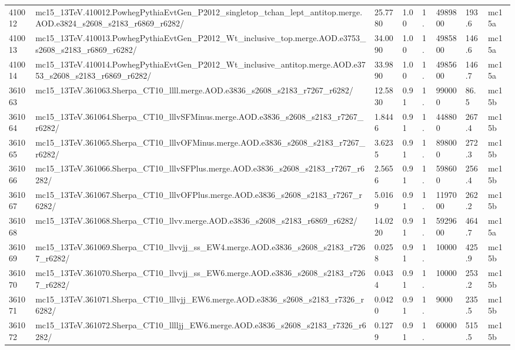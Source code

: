 \begin{sidewaystable}[!hp]
\begin{center}
{\begin{tabular}{llllllll}
410012  &  mc15\_13TeV.410012.PowhegPythiaEvtGen\_P2012\_singletop\_tchan\_lept\_antitop.merge.AOD.e3824\_s2608\_s2183\_r6869\_r6282/  &  25.7780  &  1.00  &  1.  &  4989800  &  193.6  &  mc15a \\
410013  &  mc15\_13TeV.410013.PowhegPythiaEvtGen\_P2012\_Wt\_inclusive\_top.merge.AOD.e3753\_s2608\_s2183\_r6869\_r6282/  &  34.0090  &  1.00  &  1.  &  4985800  &  146.6  &  mc15a \\
410014  &  mc15\_13TeV.410014.PowhegPythiaEvtGen\_P2012\_Wt\_inclusive\_antitop.merge.AOD.e3753\_s2608\_s2183\_r6869\_r6282/  &  33.9890  &  1.00  &  1.  &  4985600  &  146.7  &  mc15a \\
\hline
361063  &  mc15\_13TeV.361063.Sherpa\_CT10\_llll.merge.AOD.e3836\_s2608\_s2183\_r7267\_r6282/  &  12.5830  &  0.91  &  1.  &  990000  &  86.5  &  mc15b \\
361064  &  mc15\_13TeV.361064.Sherpa\_CT10\_lllvSFMinus.merge.AOD.e3836\_s2608\_s2183\_r7267\_r6282/  &  1.8446  &  0.91  &  1.  &  448800  &  267.4  &  mc15b \\
361065  &  mc15\_13TeV.361065.Sherpa\_CT10\_lllvOFMinus.merge.AOD.e3836\_s2608\_s2183\_r7267\_r6282/  &  3.6235  &  0.91  &  1.  &  898000  &  272.3  &  mc15b \\
361066  &  mc15\_13TeV.361066.Sherpa\_CT10\_lllvSFPlus.merge.AOD.e3836\_s2608\_s2183\_r7267\_r6282/  &  2.5656  &  0.91  &  1.  &  598600  &  256.4  &  mc15b \\
361067  &  mc15\_13TeV.361067.Sherpa\_CT10\_lllvOFPlus.merge.AOD.e3836\_s2608\_s2183\_r7267\_r6282/  &  5.0169  &  0.91  &  1.  &  1197000  &  262.2  &  mc15b \\
361068  &  mc15\_13TeV.361068.Sherpa\_CT10\_llvv.merge.AOD.e3836\_s2608\_s2183\_r6869\_r6282/  &  14.0220  &  0.91  &  1.  &  5929600  &  464.7  &  mc15a \\
361069  &  mc15\_13TeV.361069.Sherpa\_CT10\_llvvjj\_ss\_EW4.merge.AOD.e3836\_s2608\_s2183\_r7267\_r6282/  &  0.0258  &  0.91  &  1.  &  10000  &  425.9  &  mc15b \\
361070  &  mc15\_13TeV.361070.Sherpa\_CT10\_llvvjj\_ss\_EW6.merge.AOD.e3836\_s2608\_s2183\_r7267\_r6282/  &  0.0434  &  0.91  &  1.  &  10000  &  253.2  &  mc15b \\
361071  &  mc15\_13TeV.361071.Sherpa\_CT10\_lllvjj\_EW6.merge.AOD.e3836\_s2608\_s2183\_r7326\_r6282/  &  0.0420  &  0.91  &  1.  &  9000  &  235.5  &  mc15b \\
361072  &  mc15\_13TeV.361072.Sherpa\_CT10\_lllljj\_EW6.merge.AOD.e3836\_s2608\_s2183\_r7326\_r6282/  &  0.1279  &  0.91  &  1.  &  60000  &  515.5  &  mc15b \\

\end{tabular}}
\end{center}
\end{sidewaystable}
